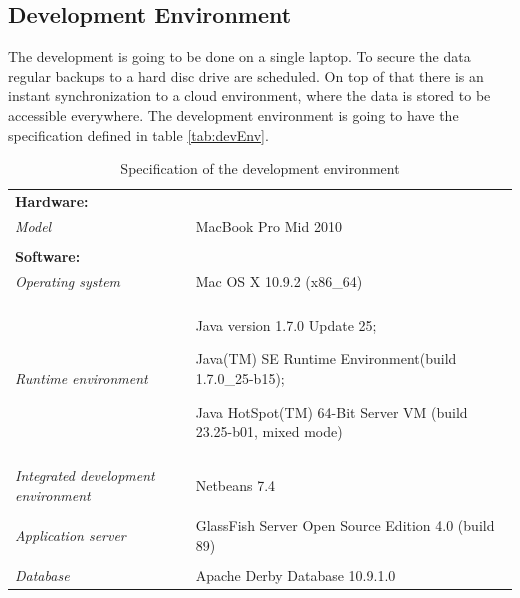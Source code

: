 \documentclass[11pt,a4paper]{report}
\begin{document}
\subsection{Development Environment}
The development is going to be done on a single laptop. To secure the data regular backups to a hard disc drive are scheduled. On top of that there is an instant synchronization to a cloud environment, where the data is stored to be accessible everywhere. The development environment is going to have the specification defined in table \vref{tab:devEnv}.
\begin{table}[h!]
    \begin{tabularx}{\textwidth}{l | X}
        \textbf{Hardware:} & \\
        \emph{Model} & MacBook Pro Mid 2010 \\
        \\
        \textbf{Software:} & \\
        \emph{Operating system} & Mac OS X 10.9.2 (x86\_64)\\
        \\
        \emph{Runtime environment} & Java version 1.7.0 Update 25;
        
        Java(TM) SE Runtime Environment(build 1.7.0\_25-b15);
        
        Java HotSpot(TM) 64-Bit Server VM (build 23.25-b01, mixed mode)\\
        \\
        \emph{Integrated development environment} & Netbeans 7.4 \\  
        \\
        \emph{Application server} & GlassFish Server Open Source Edition  4.0  (build 89) \\
        \\
        \emph{Database} & Apache Derby Database 10.9.1.0 \\
    \end{tabularx}
\caption{Specification of the development environment}
\label{tab:devEnv}
\end{table}
\end{document}

